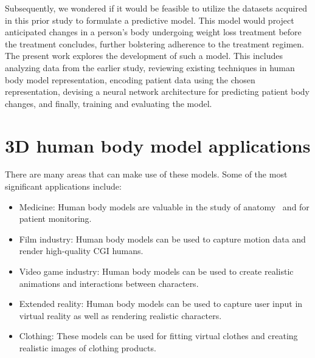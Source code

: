Subsequently, we wondered if it would be feasible to utilize the datasets
acquired in this prior study to formulate a predictive model. This model would
project anticipated changes in a person's body undergoing weight loss treatment
before the treatment concludes, further bolstering adherence to the treatment
regimen. The present work explores the development of such a model. This
includes analyzing data from the earlier study, reviewing existing techniques
in human body model representation, encoding patient data using the chosen
representation, devising a neural network architecture for predicting patient
body changes, and finally, training and evaluating the model.

\section{3D human body model applications}

There are many areas that can make use of these models. Some of the most
significant applications include:

\begin{itemize}
      \item Medicine: Human body models are valuable in the study of
            anatomy~\cite{https://doi.org/10.1002/ase.1718} and for patient monitoring.
      \item Film industry: Human body models can be used to capture motion data and render
            high-quality CGI humans.
      \item Video game industry: Human body models can be used to create realistic
            animations and interactions between characters\cite{Starke2021}.
      \item Extended reality: Human body models can be used to capture user input in
            virtual reality as well as rendering realistic characters.
      \item Clothing: These models can be used for fitting virtual
            clothes\cite{apeagyei2010application} and creating realistic images of clothing
            products.
\end{itemize}